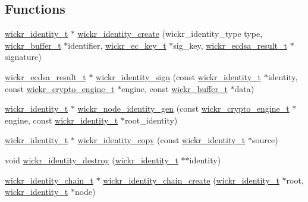 \subsection*{Functions}
\begin{DoxyCompactItemize}
\item 
\hyperlink{structwickr__identity}{wickr\+\_\+identity\+\_\+t} $\ast$ \hyperlink{group__wickr__identity_ga75bfef275a250a32784231e8c042913b}{wickr\+\_\+identity\+\_\+create} (wickr\+\_\+identity\+\_\+type type, \hyperlink{structwickr__buffer}{wickr\+\_\+buffer\+\_\+t} $\ast$identifier, \hyperlink{structwickr__ec__key}{wickr\+\_\+ec\+\_\+key\+\_\+t} $\ast$sig\+\_\+key, \hyperlink{structwickr__ecdsa__result}{wickr\+\_\+ecdsa\+\_\+result\+\_\+t} $\ast$signature)
\item 
\hyperlink{structwickr__ecdsa__result}{wickr\+\_\+ecdsa\+\_\+result\+\_\+t} $\ast$ \hyperlink{group__wickr__identity_ga32097764e57e70d85a2e1277146495c9}{wickr\+\_\+identity\+\_\+sign} (const \hyperlink{structwickr__identity}{wickr\+\_\+identity\+\_\+t} $\ast$identity, const \hyperlink{structwickr__crypto__engine}{wickr\+\_\+crypto\+\_\+engine\+\_\+t} $\ast$engine, const \hyperlink{structwickr__buffer}{wickr\+\_\+buffer\+\_\+t} $\ast$data)
\item 
\hyperlink{structwickr__identity}{wickr\+\_\+identity\+\_\+t} $\ast$ \hyperlink{group__wickr__identity_gae820c1efc090fef6a8d27dd700316023}{wickr\+\_\+node\+\_\+identity\+\_\+gen} (const \hyperlink{structwickr__crypto__engine}{wickr\+\_\+crypto\+\_\+engine\+\_\+t} $\ast$engine, const \hyperlink{structwickr__identity}{wickr\+\_\+identity\+\_\+t} $\ast$root\+\_\+identity)
\item 
\hyperlink{structwickr__identity}{wickr\+\_\+identity\+\_\+t} $\ast$ \hyperlink{group__wickr__identity_ga14d1fb3ddd1dbd7797eb9b628eef99fe}{wickr\+\_\+identity\+\_\+copy} (const \hyperlink{structwickr__identity}{wickr\+\_\+identity\+\_\+t} $\ast$source)
\item 
void \hyperlink{group__wickr__identity_ga9e4a0f3736d52836c9a9fc61794c8ddd}{wickr\+\_\+identity\+\_\+destroy} (\hyperlink{structwickr__identity}{wickr\+\_\+identity\+\_\+t} $\ast$$\ast$identity)
\item 
\hyperlink{structwickr__identity__chain}{wickr\+\_\+identity\+\_\+chain\+\_\+t} $\ast$ \hyperlink{group__wickr__identity_ga79551385194ba6b044b676ce5c7400e6}{wickr\+\_\+identity\+\_\+chain\+\_\+create} (\hyperlink{structwickr__identity}{wickr\+\_\+identity\+\_\+t} $\ast$root, \hyperlink{structwickr__identity}{wickr\+\_\+identity\+\_\+t} $\ast$node)
$$
\end{DoxyCompactItemize}
